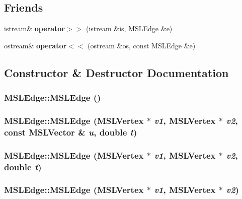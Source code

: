 \subsection*{Friends}
\begin{CompactItemize}
\item 
istream\& {\bf operator$>$$>$} (istream \&is, MSLEdge \&e)
\item 
ostream\& {\bf operator$<$$<$} (ostream \&os, const MSLEdge \&e)
\end{CompactItemize}


\subsection{Constructor \& Destructor Documentation}
\subsubsection{\setlength{\rightskip}{0pt plus 5cm}MSLEdge::MSLEdge ()}\label{classMSLEdge_a0}


\subsubsection{\setlength{\rightskip}{0pt plus 5cm}MSLEdge::MSLEdge ({\bf MSLVertex} $\ast$ {\em v1}, {\bf MSLVertex} $\ast$ {\em v2}, const {\bf MSLVector} \& {\em u}, double {\em t})}\label{classMSLEdge_a1}


\subsubsection{\setlength{\rightskip}{0pt plus 5cm}MSLEdge::MSLEdge ({\bf MSLVertex} $\ast$ {\em v1}, {\bf MSLVertex} $\ast$ {\em v2}, double {\em t})}\label{classMSLEdge_a2}


\subsubsection{\setlength{\rightskip}{0pt plus 5cm}MSLEdge::MSLEdge ({\bf MSLVertex} $\ast$ {\em v1}, {\bf MSLVertex} $\ast$ {\em v2})}\label{classMSLEdge_a3}


